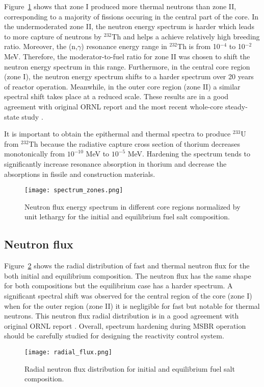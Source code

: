 Figure~\ref{fig:spectrum_zones} shows that zone I produced more thermal neutrons 
than zone II, corresponding to a majority of fissions occuring in the central part 
of the core. In the undermoderated zone II, the neutron energy spectrum is harder 
which leads to more capture of neutrons by $^{232}$Th and helps a achieve relatively 
high breeding ratio. Moreover, the (n,$\gamma$) resonance energy range in $^{232}$Th 
is from 10$^{-4}$ to 10$^{-2}$ MeV. Therefore, the moderator-to-fuel ratio for zone 
II was chosen to shift the neutron energy spectrum in this range. Furthermore, in the 
central core region (zone I), the neutron energy spectrum shifts to a harder spectrum 
over 20 years of reactor operation. Meanwhile, in the outer core region (zone II) a 
similar spectral shift takes place at a reduced scale. These results are in a good 
agreement with original ORNL report \cite{robertson_conceptual_1971} and the most recent 
whole-core steady-state study \cite{park_whole_2015}.

It is important to obtain the epithermal and thermal spectra to produce $^{233}$U from 
$^{232}$Th because the radiative capture cross section of thorium decreases monotonically 
from $10^{-10}$ MeV to $10^{-5}$ MeV. Hardening the spectrum tends to significantly 
increase resonance absorption in thorium and decrease the absorptions in fissile and 
construction materials. 
\begin{figure}[ht!] %
  \centering
  \texttt{[image: spectrum\_zones.png]} 
  \caption{Neutron flux energy spectrum in different core regions normalized by 
unit lethargy for the initial and equilibrium fuel salt composition.}
  \label{fig:spectrum_zones}
\end{figure}

\subsection{Neutron flux}
Figure~\ref{fig:radial_flux} shows the radial distribution of fast and thermal 
neutron flux for the both initial and equilibrium composition. The neutron flux has 
the same shape for both compositions but the equilibrium case has a harder 
spectrum. A significant spectral shift was observed for the central region of 
the core (zone I) when for the outer region (zone II) it is negligible for fast 
but notable for thermal neutrons. This neutron flux radial distribution is in a 
good agreement with original ORNL report \cite{robertson_conceptual_1971}. 
Overall, spectrum hardening during \gls{MSBR} operation should be carefully 
studied for designing the reactivity control system.
\begin{figure}[ht!] %
  \texttt{[image: radial\_flux.png]} \caption{Radial neutron 
  flux distribution for initial and equilibrium fuel salt composition.}
  \label{fig:radial_flux}
\end{figure}

